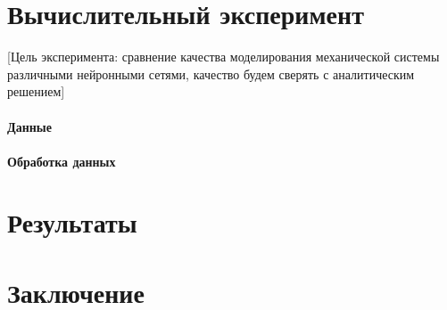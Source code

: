 \documentclass[12pt, twoside]{article}
\begin{document}
\section{Вычислительный эксперимент}

[Цель эксперимента: сравнение качества моделирования механической системы различными нейронными сетями, качество будем сверять с аналитическим решением]

\paragraph{Данные}

\paragraph{Обработка данных}

\section{Результаты}

\section{Заключение}




\begin{comment}
    
\bibitem{Isachenko_en}
    \emph{Isachenko R.V., Strijov V.V.}
    Quadratic programming feature selection for multicorrelated signal decoding with partial least squares~//
    Expert Systems with Applications,
    Volume 207, 30 November 2022, 117967
    
\end{comment}
\end{document}
